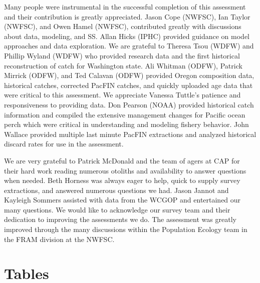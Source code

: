 \documentclass[12pt,]{article}
\begin{document}
Many people were instrumental in the successful completion of this
assessment and their contribution is greatly appreciated. Jason Cope
(NWFSC), Ian Taylor (NWFSC), and Owen Hamel (NWFSC), contributed greatly
with discussions about data, modeling, and SS. Allan Hicks (IPHC)
provided guidance on model approaches and data exploration. We are
grateful to Theresa Tsou (WDFW) and Phillip Wyland (WDFW) who provided
research data and the first historical reconstruction of catch for
Washington state. Ali Whitman (ODFW), Patrick Mirrick (ODFW), and Ted
Calavan (ODFW) provided Oregon composition data, historical catches,
corrected PacFIN catches, and quickly uploaded age data that were
critical to this assessment. We appreciate Vanessa Tuttle's patience and
responsiveness to providing data. Don Pearson (NOAA) provided historical
catch information and compiled the extensive management changes for
Pacific ocean perch which were critical in understanding and modeling
fishery behavior. John Wallace provided multiple last minute PacFIN
extractions and analyzed historical discard rates for use in the
assessment.

We are very grateful to Patrick McDonald and the team of agers at CAP
for their hard work reading numerous otoliths and availability to answer
questions when needed. Beth Horness was always eager to help, quick to
supply survey extractions, and answered numerous questions we had. Jason
Jannot and Kayleigh Sommers assisted with data from the WCGOP and
entertained our many questions. We would like to acknowledge our survey
team and their dedication to improving the assessments we do. The
assessment was greatly improved through the many discussions within the
Population Ecology team in the FRAM division at the NWFSC.

\newpage

\FloatBarrier

\section{Tables}\label{tables}
\end{document}
